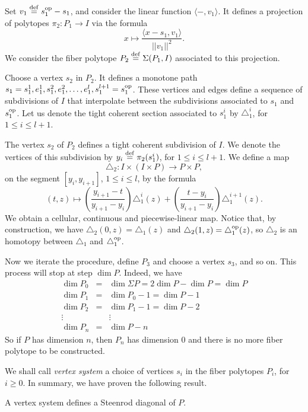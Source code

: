 Set $v_1 \stackrel{\mathrm{def}}{=} s_1^{\mathrm{op}}-s_1$, and consider the linear function $\langle - , v_1 \rangle$.
It defines a projection of polytopes $\pi_2 \colon P_1 \to I$ via the formula
\[
x \mapsto \frac{\langle x-s_1, v_1 \rangle}{||v_1||^2}.
\]
We consider the fiber polytope $P_2 \stackrel{\mathrm{def}}{=} \Sigma(P_1,I)$ associated to this projection.

Choose a vertex $s_2$ in $P_2$. It defines a monotone path $s_1 = s_1^1, e_1^1, s_1^2, e_1^2, \dots, e_1^l, s_1^{l+1} = s^{\mathrm{op}}_1$.
These vertices and edges define a sequence of subdivisions of $I$ that interpolate between the subdivisions associated to $s_1$ and $s_1^{\mathrm{op}}$.
Let us denote the tight coherent section associated to $s_1^i$ by $\triangle_1^i$, for $1\leq i \leq l+1$.

The vertex $s_2$ of $P_2$ defines a tight coherent subdivision of $I$.
We denote the vertices of this subdivision by $y_i \stackrel{\mathrm{def}}{=} \pi_2(s_1^i)$, for $1 \leq i \leq l+1$.
We define a map
\[
\triangle_2 \colon I \times (I \times P) \to P \times P,
\]
on the segment $[y_i,y_{i+1}]$, $1 \leq i \leq l$, by the formula
\[
(t,z) \mapsto \left(\frac{y_{i+1}-t}{y_{i+1}-y_i}\right)\triangle_1^{i}(z)+\left(\frac{t-y_{i}}{y_{i+1}-y_i}\right)\triangle_1^{i+1}(z).
\]
We obtain a cellular, continuous and piecewise-linear map.
Notice that, by construction, we have $\triangle_2(0,z)=\triangle_1(z)$ and $\triangle_2(1,z)=\triangle_1^{\mathrm{op}}(z)$, so $\triangle_2$ is an homotopy between $\triangle_1$ and $\triangle_1^{\mathrm{op}}$.

Now we iterate the procedure, define $P_3$ and choose a vertex $s_3$, and so on.
This process will stop at step $\dim P$.
Indeed, we have
\begin{eqnarray*}
    \dim P_0 & = & \dim \Sigma P = 2 \dim P - \dim P = \dim P \\
    \dim P_1 & = & \dim P_0 -1 = \dim P -1 \\
    \dim P_2 & = & \dim P_1 - 1 = \dim P -2 \\
    \vdots & & \vdots  \\
    \dim P_n & = &\dim P - n
\end{eqnarray*}
So if $P$ has dimension $n$, then $P_n$ has dimension 0 and there is no more fiber polytope to be constructed.

We shall call \emph{vertex system} a choice of vertices $s_i$ in the fiber polytopes $P_i$, for $i\geq 0$. In summary, we have proven the following result.

\begin{theorem}
    A vertex system defines a Steenrod diagonal of $P$.
\end{theorem}

